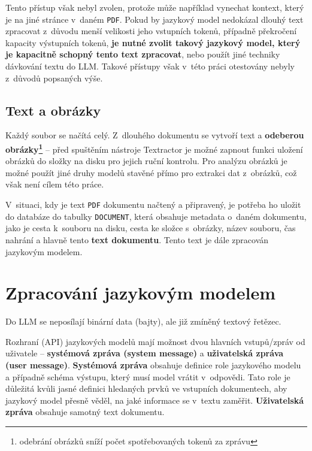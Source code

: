 \documentclass[czech, bc, kiv, he, iso690numb, pdf]{fasthesis}
\begin{document}
Tento přístup však nebyl zvolen, protože může například vynechat kontext, který je na jiné stránce v~daném \verb"PDF". Pokud by jazykový model nedokázal dlouhý text zpracovat z~důvodu menší velikosti jeho vstupních tokenů, případně překročení kapacity výstupních tokenů, \textbf{je nutné zvolit takový jazykový model, který je kapacitně schopný tento text zpracovat}, nebo použít jiné techniky dávkování textu do LLM. Takové přístupy však v~této práci otestovány nebyly z~důvodů popsaných výše.

\subsection{Text a obrázky}
Každý soubor se načítá celý. Z~dlouhého dokumentu se vytvoří text a \textbf{odeberou obrázky\footnote{odebrání obrázků sníží počet spotřebovaných tokenů za zprávu}} -- před spuštěním nástroje Textractor je možné zapnout funkci uložení obrázků do složky na disku pro jejich ruční kontrolu. %
Pro analýzu obrázků je možné použít jiné druhy modelů stavěné přímo pro extrakci dat z~obrázků, což však není cílem této práce.

V~situaci, kdy je text \verb"PDF" dokumentu načtený a připravený, je potřeba ho uložit do databáze do tabulky \verb"DOCUMENT", která obsahuje metadata o~daném dokumentu, jako je cesta k~souboru na disku, cesta ke složce s~obrázky, název souboru, čas nahrání a hlavně tento \textbf{text dokumentu}. Tento text je dále zpracován jazykovým modelem.
    
\section{Zpracování jazykovým modelem}
Do LLM se neposílají binární data (bajty), ale již zmíněný textový řetězec. %

Rozhraní (API) jazykových modelů mají možnost dvou hlavních vstupů/zpráv od uživatele -- \textbf{systémová zpráva (system message)} a \textbf{uživatelská zpráva (user message)}. \textbf{Systémová zpráva} obsahuje definice role jazykového modelu a případně schéma výstupu, který musí model vrátit v~odpovědi. Tato role je důležitá kvůli jasné definici hledaných prvků ve vstupních dokumentech, aby jazykový model přesně věděl, na jaké informace se v~textu zaměřit. \textbf{Uživatelská zpráva} obsahuje samotný text dokumentu. 
\end{document}
